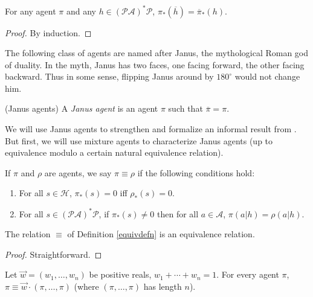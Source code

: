 \documentclass[runningheads]{llncs}
\begin{document}
\begin{lemma}
\label{asteriskcommuteswithoverlinelemma}
    For any agent $\pi$ and any $h\in(\mathcal P\mathcal A)^*\mathcal P$,
    $\pi_*(\overline h)=\overline{\pi}_*(h)$.
\end{lemma}

\begin{proof}
    By induction.
\end{proof}

The following class of agents are named after Janus, the mythological
Roman god of duality. In the myth, Janus has two faces, one facing
forward, the other facing backward. Thus in some sense, flipping Janus
around by $180^\circ$ would not change him.

\begin{definition}
    (Janus agents)
    A \emph{Janus agent} is an agent $\pi$ such that
    $\overline{\pi}=\pi$.
\end{definition}

We will use Janus agents to strengthen and formalize an informal result
from \cite{alexander2021reward}.
But first, we will use mixture agents to characterize
Janus agents (up to equivalence modulo a certain natural equivalence relation).

\begin{definition}
\label{equivdefn}
    If $\pi$ and $\rho$ are agents, we say $\pi\equiv\rho$ if the
    following conditions hold:
    \begin{enumerate}
        \item For all $s\in\mathcal H$, $\pi_*(s)=0$ iff $\rho_*(s)=0$.
        \item For all $s\in(\mathcal P\mathcal A)^*\mathcal P$,
            if $\pi_*(s)\not=0$ then for all $a\in\mathcal A$,
            $\pi(a|h)=\rho(a|h)$.
    \end{enumerate}
\end{definition}

\begin{lemma}
\label{equivrelationlemma}
    The relation $\equiv$ of Definition \ref{equivdefn} is an equivalence
    relation.
\end{lemma}

\begin{proof}
    Straightforward.
\end{proof}

\begin{lemma}
\label{piopluspilemma}
    Let $\vec w=(w_1,\ldots,w_n)$ be positive reals,
    $w_1+\cdots+w_n=1$. For every agent $\pi$,
    $\pi\equiv\vec w\cdot (\pi,\ldots,\pi)$ (where
    $(\pi,\ldots,\pi)$ has length $n$).
\end{lemma}
\end{document}
